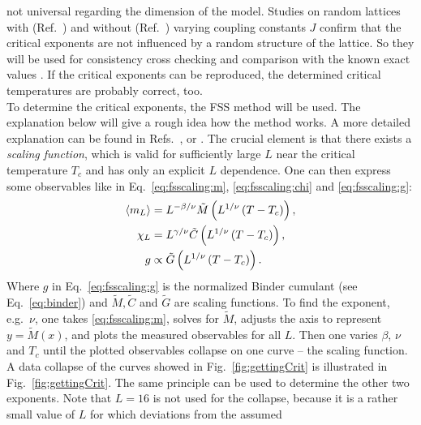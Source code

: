     not universal regarding the dimension of the model.
    Studies on random lattices with (Ref.\ \cite{Lima2000}) and without (Ref.\ \cite{Janke1994})
    varying coupling constants \(J\) confirm that the
    critical exponents are not influenced by a random structure of the lattice.
    So they will be used for consistency cross checking and
    comparison with the known exact values \cite[p. 59]{Pelissetto2002}.
    If the critical exponents can be reproduced, the determined critical
    temperatures are probably correct, too.\\
    To determine the critical exponents, the FSS method
    will be used. The explanation below will give a rough idea how
    the method works. A more detailed explanation can be found in Refs.\ \cite{Norrenbrock2011}, \cite{DMelchert2009} or \cite{Binder2010}.
    The crucial element is that there exists a \emph{scaling function},
    which is valid for sufficiently large \(L\) near the critical
    temperature \(T_{c}\) and has only an explicit \(L\) dependence.
    One can then express some observables like in Eq.\ \eqref{eq:fsscaling:m}, \eqref{eq:fsscaling:chi} and
    \eqref{eq:fsscaling:g}:
    \begin{align}
        \label{eq:fsscaling:m}
        \left< m_L \right> &= L^{-{\beta/\nu}} \tilde{M}\left(L^{1/\nu}\left(T-T_c\right)\right),\\
        \label{eq:fsscaling:chi}
        \chi_L    &= L^{{\gamma/\nu}} \tilde{C}\left(L^{1/\nu}\left(T-T_c\right)\right),\\
        \label{eq:fsscaling:g}
        g         &\propto \tilde{G}\left(L^{1/\nu}\left(T-T_c\right)\right).
    \end{align}
    Where \(g\) in Eq.\ \eqref{eq:fsscaling:g} is the normalized
    Binder cumulant (see Eq.\ \eqref{eq:binder}) and \(\tilde{M}, \tilde{C}\) and \(\tilde{G}\)
    are scaling functions.
    To find the exponent, e.g.\ \(\nu\), one takes \eqref{eq:fsscaling:m},
    solves for \(\tilde{M}\), adjusts the axis to represent \(y=\tilde{M}(x)\),
    and plots the measured observables for all \(L\).
    Then one varies \(\beta\), \(\nu\) and \(T_{c}\) until the plotted observables
    collapse on one curve -- the scaling function.
    A data collapse of the curves showed in Fig.\ \ref{fig:gettingCrit}
    is illustrated in Fig.\ \ref{fig:gettingCrit}.
    The same principle can be used to determine the other two exponents.
    Note that \(L=16\) is not used for the collapse, because it is a
    rather small value of \(L\) for which deviations from the assumed
